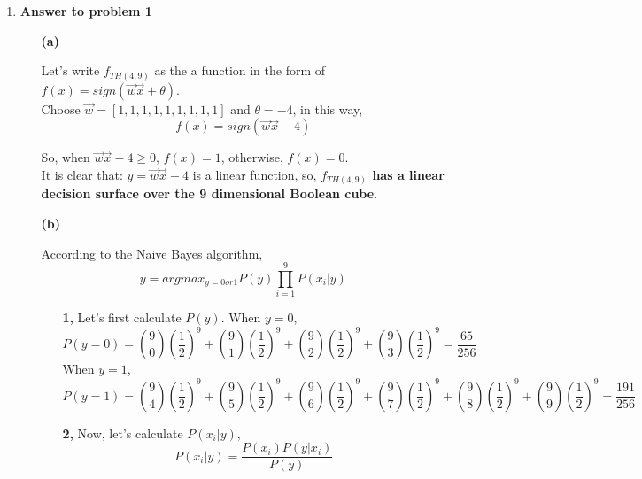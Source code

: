 
\usepackage{amsmath,url,graphicx,amssymb}
\sloppy
\usepackage{ulem}
\oddsidemargin 0in
\evensidemargin 0in
\textwidth 6.5in
\topmargin -0.5in
\textheight 9.0in
\newcommand{\ignore}[1]{}

\newcommand{\tight}[1]{\!#1\!}
\newcommand{\loose}[1]{\;#1\;}




\pagestyle{myheadings}  %

\begin{enumerate}
\item {\bf Answer to problem 1}
\begin{enumerate}
\item[{\bf (a)}]

Let's write $f_{TH(4, 9)}$ as the a function in the form of $f(x) = sign(\vec{w}\vec{x} + \theta)$.\\

Choose $\vec{w} = [1, 1, 1, 1, 1, 1, 1, 1, 1]$ and $\theta = -4$, in this way, 
$$f(x) = sign(\vec{w}\vec{x} - 4)$$

So, when $\vec{w}\vec{x} - 4 \geqslant 0$, $f(x) = 1$, otherwise, $f(x) = 0$.\\

It is clear that: $y = \vec{w}\vec{x} - 4$ is a linear function, so, {\bf $f_{TH(4, 9)}$ has a linear decision surface over the 9 dimensional Boolean cube}.\\

\item[{\bf (b)}]

According to the Naive Bayes algorithm, 
$$y = arg max_{y=0 or 1} P(y)\prod_{i=1}^9 P(x_i|y)$$

\begin{enumerate}
\item[\bf 1, ] Let's first calculate $P(y)$.
When $y=0$, 
$$P(y=0) = {9 \choose 0}(\frac{1}{2})^9 + {9 \choose 1}(\frac{1}{2})^9 + {9 \choose 2}(\frac{1}{2})^9 + {9 \choose 3}(\frac{1}{2})^9 = \frac{65}{256}$$
When $y=1$, 
$$P(y=1) = {9 \choose 4}(\frac{1}{2})^9 + {9 \choose 5}(\frac{1}{2})^9 + {9 \choose 6}(\frac{1}{2})^9 + {9 \choose 7}(\frac{1}{2})^9 + {9 \choose 8}(\frac{1}{2})^9 + {9 \choose 9}(\frac{1}{2})^9 = \frac{191}{256}$$

\item[\bf 2, ]
Now, let's calculate $P(x_i | y)$, 
$$P(x_i | y) = \frac{P(x_i)P(y|x_i)}{P(y)}$$


\end{enumerate}
\end{enumerate}
\end{enumerate}
